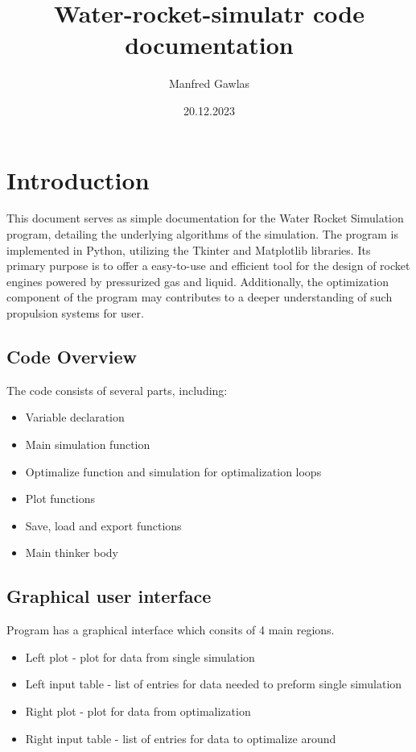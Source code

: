 \documentclass{report}
\begin{document}
\title{Water-rocket-simulatr code documentation}
\author{Manfred Gawlas}
\date{20.12.2023}

\maketitle

\tableofcontents

\chapter{Introduction}


This document serves as simple documentation for the Water Rocket Simulation program, detailing the underlying algorithms of the simulation. The program is implemented in Python, utilizing the Tkinter and Matplotlib libraries. Its primary purpose is to offer a easy-to-use and efficient tool for the design of rocket engines powered by pressurized gas and liquid. Additionally, the optimization component of the program may contributes to a deeper understanding of such propulsion systems for user.

\section{Code Overview}

The code consists of several parts, including:
\begin{itemize}
\item Variable declaration
\item Main simulation function
\item Optimalize function and simulation for optimalization loops
\item Plot functions
\item Save, load and export functions
\item Main thinker body
\end{itemize}

\section{Graphical user interface}
Program has a graphical interface which consits of 4 main regions. 
\begin{itemize}
\item Left plot - plot for data from single simulation
\item Left input table - list of entries for data needed to preform single simulation
\item Right plot - plot for data from optimalization
\item Right input table - list of entries for data to optimalize around
\end{itemize}
\end{document}
